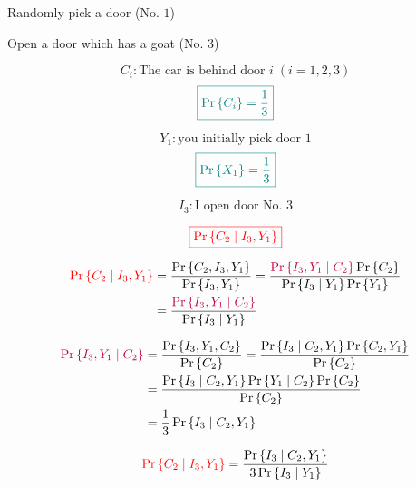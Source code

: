 
\begin{frame}{}
  \centerline{}
\end{frame}

\begin{frame}{}

  \begin{description}[(S)he]
    \centering
    \item[You:] Randomly pick a door (No. $1$)
    \item[I:] Open a door which has a goat (No. $3$)
  \end{description}

  \vspace{0.50cm}
  \centerline{}
\end{frame}

\begin{frame}{}
  \[
    C_i: \text{The car is behind door } i\; (i = 1, 2, 3)
  \]
  \[
    \textcolor{teal}{\boxed{\Pr\left\{C_i\right\} = \frac{1}{3}}}
  \]

  \pause
  \[
    Y_1: \text{you initially pick door } 1
  \]
  \[
    \textcolor{teal}{\boxed{\Pr\left\{X_1\right\} = \frac{1}{3}}}
  \]

  \pause
  \[
    I_3: \text{I open door No. } 3
  \]

  \pause
  \[
    \textcolor{red}{\boxed{\Pr\left\{C_2 \mid I_3, Y_1\right\}}}
  \]
\end{frame}

\begin{frame}{}
  \begin{align*}
    \textcolor{red}{\Pr\left\{C_2 \mid I_3, Y_1\right\}} &= \frac{\Pr\left\{C_2, I_3, Y_1\right\}}{\Pr\left\{I_3, Y_1\right\}} 
    = \frac{\textcolor{purple}{\Pr{\left\{I_3, Y_1 \mid C_2\right\}}} \Pr\left\{C_2\right\}}{\Pr\left\{I_3 \mid Y_1\right\} \Pr\left\{Y_1\right\}} \\
    &= \frac{\textcolor{purple}{\Pr{\left\{I_3, Y_1 \mid C_2\right\}}}}{\Pr\left\{I_3 \mid Y_1\right\}}
  \end{align*}

  \pause
  \begin{align*}
    \textcolor{purple}{\Pr{\left\{I_3, Y_1 \mid C_2\right\}}} &= \frac{\Pr{\left\{I_3, Y_1, C_2\right\}}}{\Pr\left\{C_2\right\}} 
    	= \frac{\Pr{\left\{I_3 \mid C_2, Y_1\right\} \Pr\left\{C_2, Y_1\right\}}}{\Pr{\left\{C_2\right\}}} \\
	&= \frac{\Pr{\left\{I_3 \mid C_2, Y_1\right\} \Pr{\left\{Y_1 \mid C_2\right\}} \Pr\left\{C_2\right\}}}{\Pr{\left\{C_2\right\}}} \\
	&= \frac{1}{3} \Pr{\left\{I_3 \mid C_2, Y_1\right\}}
  \end{align*}

  \begin{align*}
    \textcolor{red}{\Pr\left\{C_2 \mid I_3, Y_1\right\}} = \frac{\Pr{\left\{I_3 \mid C_2, Y_1\right\}}}{3 \Pr\left\{I_3 \mid Y_1\right\}}
  \end{align*}
\end{frame}

